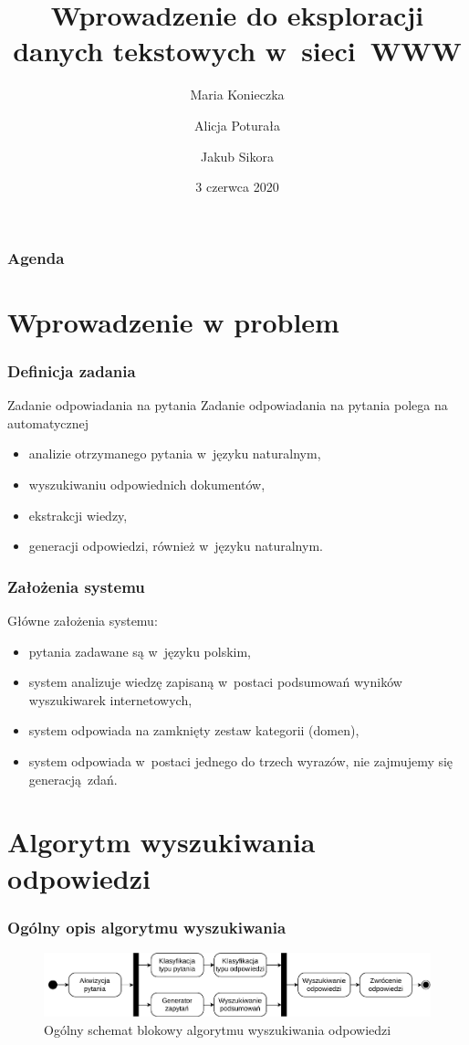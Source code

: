 \documentclass{beamer}
\title[WEDT - Projekt]{Wprowadzenie do eksploracji danych tekstowych w~sieci~WWW}
\author[Konieczka, Poturała, Sikora]{Maria Konieczka \and Alicja Poturała \and Jakub Sikora}
\date{3 czerwca 2020}
\institute[]{Odpowiadanie na pytania ogólne zadane w~języku polskim}
\begin{document}
\begin{frame}
\titlepage
\end{frame}

\begin{frame}
  \frametitle{Agenda}
  \tableofcontents
\end{frame}

\section{Wprowadzenie w problem}

\begin{frame}
  \frametitle{Definicja zadania}
  \begin{block}{Zadanie odpowiadania na pytania}
    Zadanie odpowiadania na pytania polega na automatycznej \begin{itemize}
      \item analizie otrzymanego pytania w~języku naturalnym,
      \item wyszukiwaniu odpowiednich dokumentów,
      \item ekstrakcji wiedzy,
      \item generacji odpowiedzi, również w~języku naturalnym. 
    \end{itemize}
  \end{block}
\end{frame}

\begin{frame}
  \frametitle{Założenia systemu}
  \begin{block}{Główne założenia systemu:}
  \begin{itemize}
    \item pytania zadawane są w~języku polskim,
    \item system analizuje wiedzę zapisaną w~postaci podsumowań wyników wyszukiwarek internetowych,
    \item system odpowiada na zamknięty zestaw kategorii (domen),
    \item system odpowiada w~postaci jednego do trzech wyrazów, nie zajmujemy się generacją zdań.
  \end{itemize}
\end{block}
\end{frame}

\section{Algorytm wyszukiwania odpowiedzi}
\begin{frame}
  \frametitle{Ogólny opis algorytmu wyszukiwania}
  \bigskip
  \begin{figure}
    \centering
    \includegraphics[width=\columnwidth]{figures/WEDT-Algorytm-Rotated.pdf}
    \caption{Ogólny schemat blokowy algorytmu wyszukiwania odpowiedzi}
    \label{fig:ir-algorytm}
  \end{figure}
\end{frame}
\end{document}
